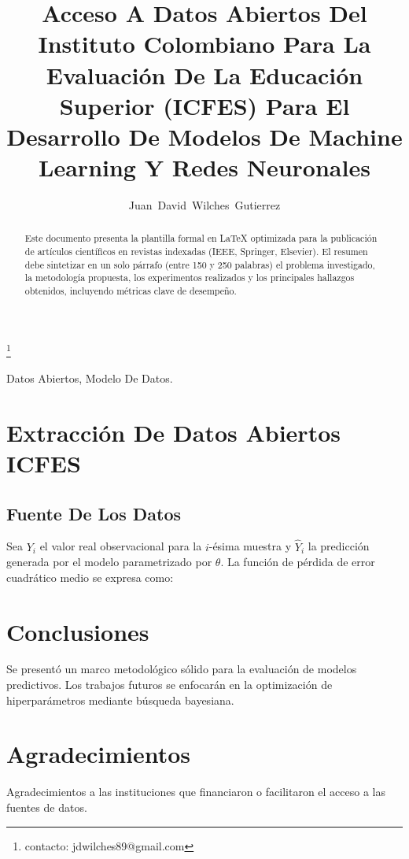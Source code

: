 \documentclass[10pt,journal,compsoc]{IEEEtran}
\begin{document}
\title{Acceso A Datos Abiertos Del Instituto Colombiano Para La Evaluación De La Educación Superior (ICFES) Para El Desarrollo De Modelos De Machine Learning Y Redes Neuronales}

\author{Juan~David~Wilches~Gutierrez}
\thanks{contacto: jdwilches89@gmail.com}


\maketitle

\begin{abstract}
Este documento presenta la plantilla formal en LaTeX optimizada para la publicación de artículos científicos en revistas indexadas (IEEE, Springer, Elsevier). El resumen debe sintetizar en un solo párrafo (entre 150 y 250 palabras) el problema investigado, la metodología propuesta, los experimentos realizados y los principales hallazgos obtenidos, incluyendo métricas clave de desempeño.
\end{abstract}

\begin{IEEEkeywords}
Datos Abiertos, Modelo De Datos.
\end{IEEEkeywords}

\section{Extracción De Datos Abiertos ICFES}
\subsection{Fuente De Los Datos}
Sea $Y_i$ el valor real observacional para la $i$-ésima muestra y $\hat{Y}_i$ la predicción generada por el modelo parametrizado por $\theta$. La función de pérdida de error cuadrático medio se expresa como:

\section{Conclusiones}
Se presentó un marco metodológico sólido para la evaluación de modelos predictivos. Los trabajos futuros se enfocarán en la optimización de hiperparámetros mediante búsqueda bayesiana.

\section*{Agradecimientos}
Agradecimientos a las instituciones que financiaron o facilitaron el acceso a las fuentes de datos.



\end{document}
